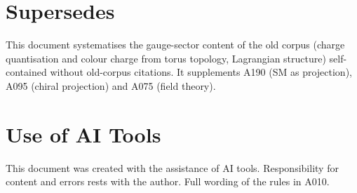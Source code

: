 \section{Supersedes}

This document systematises the gauge-sector content of the old corpus
(charge quantisation and colour charge from torus topology, Lagrangian structure)
self-contained without old-corpus citations. It supplements A190 (SM as
projection), A095 (chiral projection) and A075 (field theory).

\section{Use of AI Tools}

This document was created with the assistance of AI tools.
Responsibility for content and errors rests with the author.
Full wording of the rules in A010.

